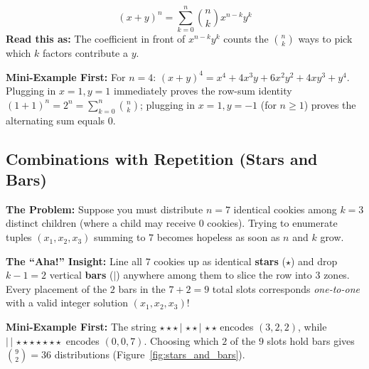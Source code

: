 \documentclass[11pt,a4paper]{article}
\theoremstyle{definition}
\newcommand{\painbeat}{\textbf{\color{accentamber}The Problem:} }
\newcommand{\ahabeat}{\textbf{\color{accentteal}The ``Aha!'' Insight:} }
\newcommand{\examplebeat}{\textbf{\color{primaryblue}Mini-Example First:} }
\begin{document}
\begin{formulabox}
\[
    (x + y)^n = \sum_{k=0}^{n} \binom{n}{k} x^{n-k} y^k
\]
\textbf{Read this as:} The coefficient in front of $x^{n-k}y^k$ counts the $\binom{n}{k}$ ways to pick which $k$ factors contribute a $y$.
\end{formulabox}

\examplebeat For $n = 4$: $(x + y)^4 = x^4 + 4x^3y + 6x^2y^2 + 4xy^3 + y^4$. Plugging in $x = 1, y = 1$ immediately proves the row-sum identity $(1 + 1)^n = 2^n = \sum_{k=0}^{n}\binom{n}{k}$; plugging in $x = 1, y = -1$ (for $n \ge 1$) proves the alternating sum equals $0$.

\subsection{Combinations with Repetition (Stars and Bars)}

\painbeat Suppose you must distribute $n = 7$ identical cookies among $k = 3$ distinct children (where a child may receive $0$ cookies). Trying to enumerate tuples $(x_1, x_2, x_3)$ summing to $7$ becomes hopeless as soon as $n$ and $k$ grow.

\ahabeat Line all $7$ cookies up as identical \textbf{stars} ($\star$) and drop $k - 1 = 2$ vertical \textbf{bars} ($|$) anywhere among them to slice the row into $3$ zones. Every placement of the $2$ bars in the $7 + 2 = 9$ total slots corresponds \emph{one-to-one} with a valid integer solution $(x_1, x_2, x_3)$!

\examplebeat The string $\star\star\star\,|\,\star\star\,|\,\star\star$ encodes $(3, 2, 2)$, while $|\,|\,\star\star\star\star\star\star\star$ encodes $(0, 0, 7)$. Choosing which $2$ of the $9$ slots hold bars gives $\binom{9}{2} = 36$ distributions (Figure~\ref{fig:stars_and_bars}).
\end{document}
